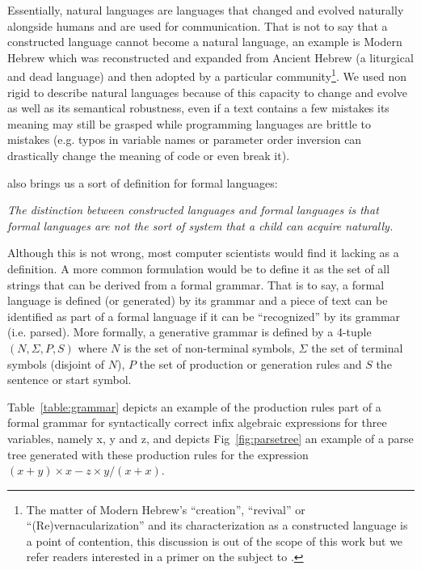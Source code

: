 Essentially, natural languages are languages that changed and evolved naturally alongside humans and are used for communication. That is not to say that a constructed language cannot become a natural language, an example is Modern Hebrew which was reconstructed and expanded from Ancient Hebrew (a liturgical and dead language) and then adopted by a particular community\footnote{The matter of Modern Hebrew's ``creation'', ``revival'' or ``(Re)vernacularization''\citep{spolsky1995conditions} and its characterization as a constructed language is a point of contention, this discussion is out of the scope of this work but we refer readers interested in a primer on the subject to \citet{izre2003emergence}.}.
We used non rigid to describe natural languages because of this capacity to change and evolve as well as its semantical robustness, even if a text contains a few mistakes its meaning may still be grasped while programming languages are brittle to mistakes (e.g. typos in variable names or parameter order inversion can drastically change the meaning of code or even break it).

\citet{lang_file} also brings us a sort of definition for formal languages:

\begin{myquote}
\textit{The distinction between constructed languages and formal languages is that formal languages are not the sort of system that a child can acquire naturally.} \\\citet{lang_file}
\end{myquote}


Although this is not wrong, most computer scientists would find it lacking as a definition. A more common formulation would be to define it as the set of all strings that can be derived from a formal grammar. That is to say, a formal language is defined (or generated) by its grammar and a piece of text can be identified as part of a formal language if it can be ``recognized'' by its grammar (i.e. parsed). More formally, a generative grammar is defined by a 4-tuple $(N, \Sigma, P, S)$ where $N$ is the set of non-terminal symbols, $\Sigma$ the set of terminal symbols (disjoint of $N$), $P$ the set of production or generation rules and $S$ the sentence or start symbol.

Table~\ref{table:grammar} depicts an example of the production rules part of a formal grammar for syntactically correct infix algebraic expressions for three variables, namely x, y and z, and depicts Fig~\ref{fig:parsetree} an example of a parse tree generated with these production rules for the expression $(x + y) \times x - z \times y / (x + x)$.


